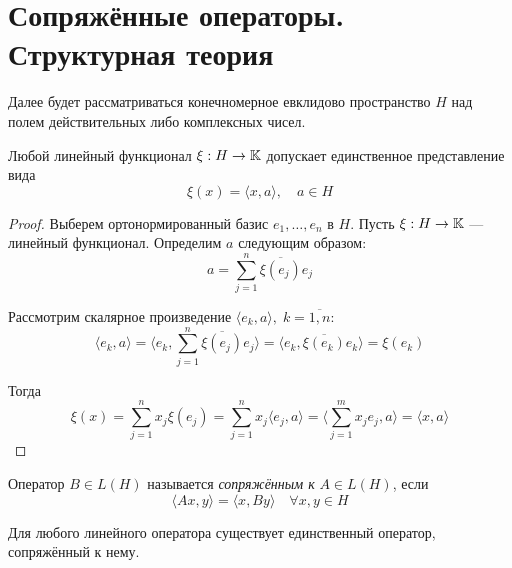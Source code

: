 \section{Сопряжённые операторы. Структурная теория}

Далее будет рассматриваться конечномерное евклидово пространство $H$ над полем
действительных либо комплексных чисел.

\begin{lemma} \label{le:functionalform}
    Любой линейный функционал $\xi : H \to \mathbb{K}$ допускает единственное
    представление вида
    \[ \xi(x) = \langle x, a\rangle, \quad a \in H \]
\end{lemma}

\begin{proof}
    Выберем ортонормированный базис $e_1, \dotsc, e_n$ в $H$. Пусть $\xi : H \to
    \mathbb{K}$ — линейный функционал. Определим $a$ следующим образом:
    \[ a = \sum_{j=1}^n \overline{\xi(e_j)} e_j \]

    Рассмотрим скалярное произведение $\langle e_k, a \rangle, \; k =
    \overline{1,n}$:
    \[ \langle e_k, a \rangle = \langle e_k, \sum_{j=1}^n \overline{\xi(e_j)}
    e_j \rangle = \langle e_k, \overline{\xi(e_k)} e_k \rangle = \xi(e_k) \]

    Тогда
    \[ \xi(x) = \sum_{j=1}^n x_j \xi(e_j) = \sum_{j=1}^n x_j \langle
        e_j, a\rangle = \langle \sum_{j=1}^m x_j e_j, a\rangle = \langle
    x, a\rangle \] 
\end{proof}

\begin{definition}
    Оператор $B\in L(H)$ называется \emph{сопряжённым к} $A\in L(H)$, если
    \[ \langle Ax, y \rangle = \langle x, By\rangle \quad \forall x, y \in H\]
\end{definition}

\begin{lemma}
    Для любого линейного оператора существует единственный оператор, сопряжённый
    к нему.
\end{lemma}

